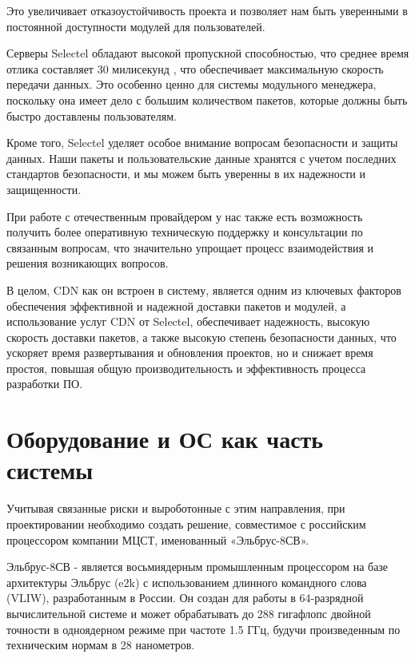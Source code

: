 Это увеличивает отказоустойчивость проекта и позволяет нам быть уверенными в постоянной доступности модулей для пользователей.

Серверы Selectel обладают высокой пропускной способностью, что среднее время отлика составляет 30 милисекунд \cite{cdn:selectel}, что обеспечивает максимальную скорость передачи данных. Это особенно ценно для системы модульного менеджера, поскольку она имеет дело с большим количеством пакетов, которые должны быть быстро доставлены пользователям.

Кроме того, Selectel уделяет особое внимание вопросам безопасности и защиты данных. Наши пакеты и пользовательские данные хранятся с учетом последних стандартов безопасности, и мы можем быть уверенны в их надежности и защищенности.

При работе с отечественным провайдером у нас также есть возможность получить более оперативную техническую поддержку и консультации по связанным вопросам, что значительно упрощает процесс взаимодействия и решения возникающих вопросов.

В целом, CDN как он встроен в систему, является одним из ключевых факторов обеспечения эффективной и надежной доставки пакетов и модулей, а использование услуг CDN от Selectel, обеспечивает надежность, высокую скорость доставки пакетов, а также высокую степень безопасности данных, что ускоряет время развертывания и обновления проектов, но и снижает время простоя, повышая общую производительность и эффективность процесса разработки ПО.

\section{Оборудование и ОС как часть системы}

Учитывая связанные риски и выроботонные с этим направления, при проектировании необходимо создать решение, совместимое с российским процессором компании МЦСТ, именованный «Эльбрус-8СВ». \cite{dev:elbrus_cpu}

Эльбрус-8СВ - является восьмиядерным промышленным процессором на базе архитектуры Эльбрус (e2k) с использованием длинного командного слова (VLIW), разработанным в России. Он создан для работы в 64-разрядной вычислительной системе и может обрабатывать до 288 гигафлопс двойной точности в одноядерном режиме при частоте 1.5 ГГц, будучи произведенным по техническим нормам в 28 нанометров. 


